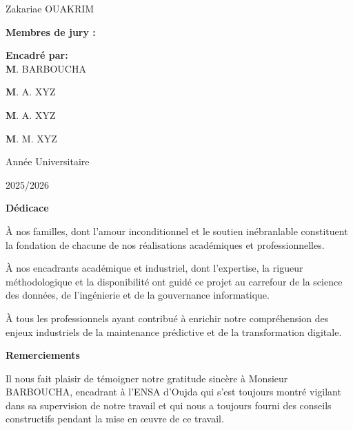\documentclass[a4paper,12pt]{report}
\begin{document}
\begin{titlepage}
\begin{center}
    Zakariae OUAKRIM\par
\end{center}

\vspace{1cm}

\textbf {Membres de jury :}\hfill\parbox[t]{6cm}{\textbf{Encadré par:\\}\textbf{M}. BARBOUCHA}\par
\textbf {M}. A. XYZ\par
\textbf {M}. A. XYZ\par
\textbf {M}. M. XYZ\par

\vfill

\begin{center}
    \hrulefill\par
    \vspace{0.5cm}
    Année Universitaire\par
    2025/2026
\end{center}

\end{titlepage}
\restoregeometry

\newpage
\thispagestyle{empty}
\begin{center}
\Large\textbf{Dédicace}
\end{center}

\vspace{3cm}

À nos familles, dont l'amour inconditionnel et le soutien inébranlable constituent la fondation de chacune de nos réalisations académiques et professionnelles.

À nos encadrants académique et industriel, dont l'expertise, la rigueur méthodologique et la disponibilité ont guidé ce projet au carrefour de la science des données, de l'ingénierie et de la gouvernance informatique.

À tous les professionnels ayant contribué à enrichir notre compréhension des enjeux industriels de la maintenance prédictive et de la transformation digitale.

\newpage
\thispagestyle{empty}
\begin{center}
\Large\textbf{Remerciements}
\end{center}

\vspace{2.5cm}

Il nous fait plaisir de témoigner notre gratitude sincère à Monsieur BARBOUCHA, encadrant à l’ENSA d’Oujda qui s’est toujours montré vigilant dans sa supervision de notre travail et qui nous a toujours fourni des conseils constructifs pendant la mise en œuvre de ce travail.
\end{document}
